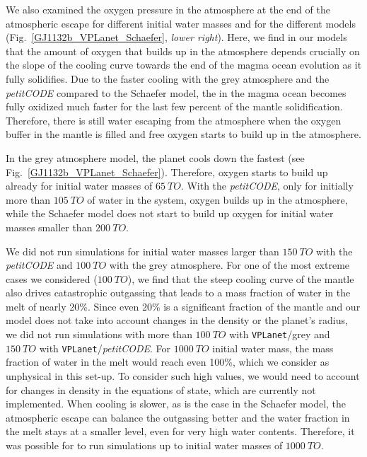 \documentclass[paper=letterpaper,fontsize=12pt,oneside,twocolumn]{article}
\newcommand{\vplanet}{\texttt{\footnotesize{VPLanet}}}
\newcommand{\petit}{\textit{petitCODE}}
\begin{document}
We also examined the oxygen pressure in the atmosphere at the end of the atmospheric escape for different initial water masses and for the different models (Fig.~\ref{GJ1132b_VPLanet_Schaefer}, \textit{lower right}). Here, we find in our models that the amount of oxygen that builds up in the atmosphere depends crucially on the slope of the cooling curve towards the end of the magma ocean evolution as it fully solidifies.  Due to the faster cooling with the grey atmosphere and the \petit{} compared to the Schaefer model, the  in the magma ocean becomes fully oxidized much faster for the last few percent of the mantle solidification. Therefore, there is still water escaping from the atmosphere when the oxygen buffer in the mantle is filled and free oxygen starts to build up in the atmosphere.

In the grey atmosphere model, the planet cools down the fastest (see Fig.~\ref{GJ1132b_VPLanet_Schaefer}).
Therefore, oxygen starts to build up already for initial water masses of $\SI{65}{TO}$. 
With the \petit{}, only for initially more than $\SI{105}{TO}$ of water in the system, oxygen builds up in the atmosphere, while the Schaefer model does not start to build up oxygen for initial water masses smaller than $\SI{200}{TO}$.

We did not run simulations for initial water masses larger than $\SI{150}{TO}$ with the \petit{} and $\SI{100}{TO}$ with the grey atmosphere. For one of the most extreme cases we considered ($\SI{100}{TO}$), we find that the steep cooling curve of the mantle also drives catastrophic outgassing that leads to a mass fraction of water in the melt of nearly 20\%. Since even 20\% is a significant fraction of the mantle and our model does not take into account changes in the density or the planet's radius, we did not run simulations with more than $\SI{100}{TO}$ with \vplanet{}/grey and $\SI{150}{TO}$ with \vplanet{}/\petit{}. For $\SI{1000}{TO}$ initial water mass, the mass fraction of water in the melt would reach even 100\%, which we consider as unphysical in this set-up. To consider such high values, we would need to account for changes in density in the equations of state, which are currently not implemented.
When cooling is slower, as is the case in the Schaefer model, the atmospheric escape can balance the outgassing better and the water fraction in the melt stays at a smaller level, even for very high water contents. Therefore, it was possible for \citet{Schaefer2016} to run simulations up to initial water masses of $\SI{1000}{TO}$.
\end{document}
